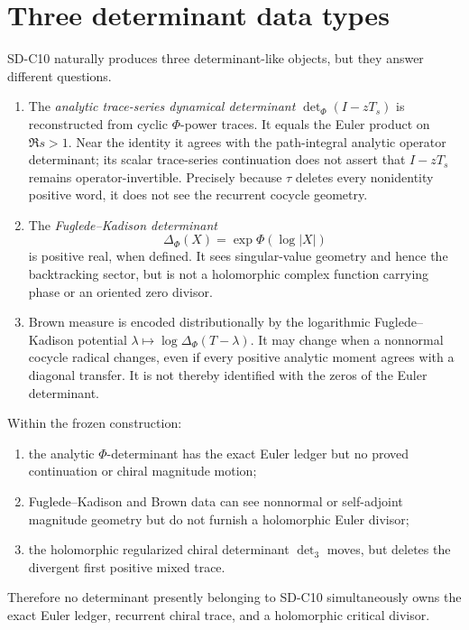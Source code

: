 \section{Three determinant data types}
\label{sec:det-boundary}

SD-C10 naturally produces three determinant-like objects, but they answer
different questions.

\begin{enumerate}
 \item The \emph{analytic trace-series dynamical determinant}
 $\det_\Phi(I-zT_s)$ is reconstructed from cyclic $\Phi$-power traces.  It
 equals the Euler product on $\Re s>1$.  Near the identity it agrees with the
 path-integral analytic operator determinant; its scalar trace-series
 continuation does not assert that $I-zT_s$ remains operator-invertible.
 Precisely because $\tau$ deletes every nonidentity positive word, it does
 not see the recurrent cocycle geometry.

 \item The \emph{Fuglede--Kadison determinant}
 \[
  \Delta_\Phi(X)=\exp\Phi(\log|X|)
 \]
 is positive real, when defined.  It sees singular-value geometry and hence
 the backtracking sector, but is not a holomorphic complex function carrying
 phase or an oriented zero divisor.

 \item Brown measure is encoded distributionally by the logarithmic
 Fuglede--Kadison potential $\lambda\mapsto\log\Delta_\Phi(T-\lambda)$.
 It may change when a nonnormal cocycle radical changes, even if every
 positive analytic moment agrees with a diagonal transfer.  It is not thereby
 identified with the zeros of the Euler determinant.
\end{enumerate}

\begin{theorem}
\label{thm:trilemma}
Within the frozen construction:
\begin{enumerate}
 \item the analytic $\Phi$-determinant has the exact Euler ledger but no
       proved continuation or chiral magnitude motion;
 \item Fuglede--Kadison and Brown data can see nonnormal or self-adjoint
       magnitude geometry but do not furnish a holomorphic Euler divisor;
 \item the holomorphic regularized chiral determinant $\det_3$ moves, but
       deletes the divergent first positive mixed trace.
\end{enumerate}
Therefore no determinant presently belonging to SD-C10 simultaneously owns
the exact Euler ledger, recurrent chiral trace, and a holomorphic critical
divisor.
\end{theorem}

